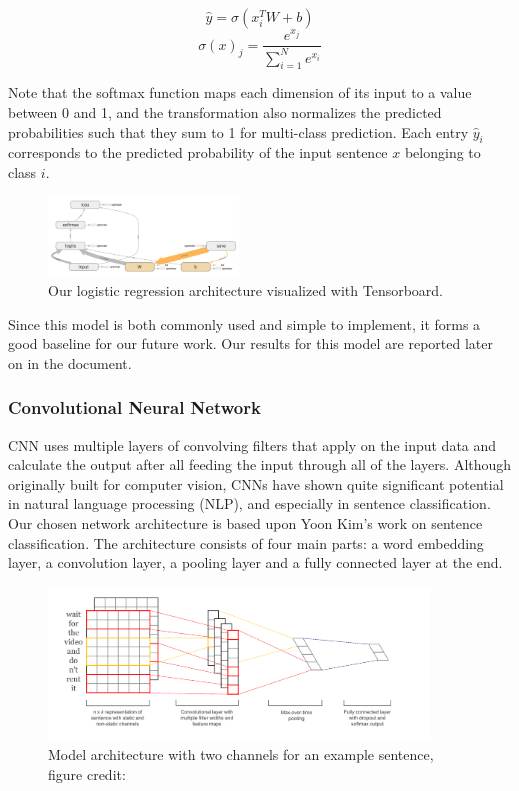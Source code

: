 \documentclass[conference]{IEEEtran}
\begin{document}
    $$\hat{y} = \sigma(x^T_i W +b)$$
    $$\sigma (x)_{j}={\frac {e^{x_{j}}}{\sum _{i=1}^{N}e^{x_{i}}}}$$
    
    Note that the softmax function maps each dimension of its input to a value between 0 and 1, and the
    transformation also normalizes the predicted probabilities such that they sum to 1
    for multi-class prediction. Each entry $\hat{y}_i$ corresponds to the predicted
    probability of the input sentence $x$ belonging to class $i$.
    \begin{figure}[]
        \includegraphics[width=0.45\textwidth]{figure/model_architecture}
        \caption{Our logistic regression architecture visualized with Tensorboard.}
    \end{figure}
    
    Since this model is both commonly used and simple to implement, it forms a good baseline
    for our future work. Our results for this model are reported later on in the document.

\subsubsection{Convolutional Neural Network}
\label{model:core:cnn}
    CNN uses multiple layers of convolving filters that apply on the input data and
    calculate the output after all feeding the input through all of the layers. Although
    originally built for computer vision, CNNs have shown quite significant potential in
    natural language processing (NLP), and especially in sentence classification.
    Our chosen network architecture is based upon Yoon Kim's work on sentence
    classification\cite{kim2014convolutional}. The architecture consists of four 
    main parts: a word
    embedding layer, a convolution layer, a pooling layer and a fully connected layer
    at the end.
    \begin{figure}
    \center\includegraphics[width=0.9\textwidth]{figure/sc_model}
    \caption{Model architecture with two channels for an example sentence,
     figure credit: \cite{kim2014convolutional}}
    \end{figure}
\end{document}
